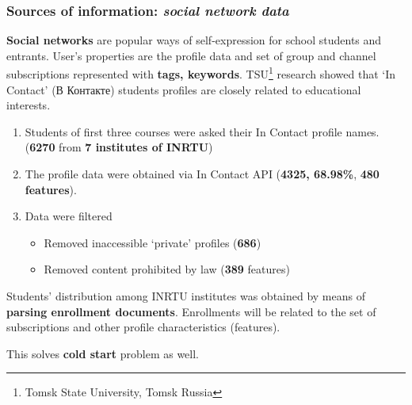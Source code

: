 \documentclass[10pt,dvipsnames]{beamer}
\newcommand{\irnitu}{INRTU}
\begin{document}
\begin{frame}
  \frametitle{Sources of information: \emph{social network data}}
  \textbf{Social networks} are popular ways of self-expression for school students and entrants.  User's properties are the profile data and set of group and channel subscriptions represented with \textbf{tags, keywords}.  TSU\footnote{Tomsk State University, Tomsk Russia} research showed that `In Contact'  (В Контакте) students profiles are closely related to educational interests.

  \begin{enumerate}
  \item Students of first three courses were asked their In Contact profile names. (\textbf{6270} from \textbf{7 institutes of \irnitu{}})
  \item The profile data were obtained via In Contact API (\textbf{4325, 68.98\%}, \textbf{480 features}).
  \item Data were filtered
    \begin{itemize}
    \item Removed inaccessible `private' profiles (\textbf{686})
    \item Removed content prohibited by law (\textbf{389} features)
    \end{itemize}
  \end{enumerate}

  Students' distribution among \irnitu{} institutes was obtained by means of \textbf{parsing enrollment documents}.  Enrollments will be related to the set of subscriptions and other profile characteristics (features).

  This solves \textbf{cold start} problem as well.

\end{frame}
\end{document}
